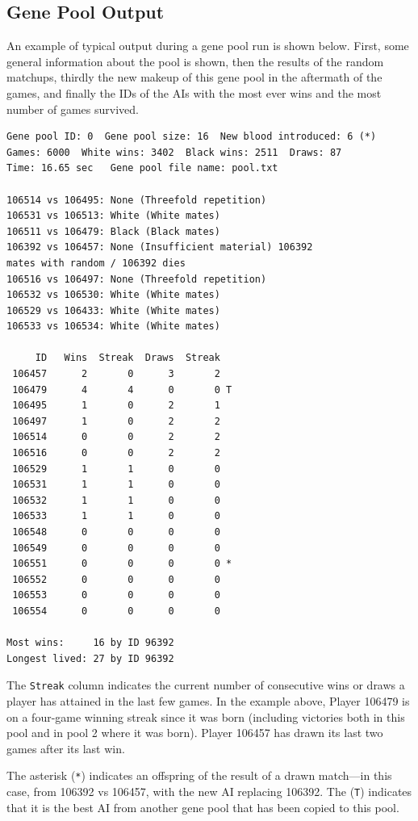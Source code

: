 \documentclass[letterpaper]{article}
\renewcommand{\_}{\allowbreak\textunderscore\allowbreak}
\begin{document}
\subsection{Gene Pool Output}
An example of typical output during a gene pool run is shown below. First, some general information about the pool is shown, then the results of the random matchups, thirdly the new makeup of this gene pool in the aftermath of the games, and finally the IDs of the AIs with the most ever wins and the most number of games survived.
\begin{verbatim}
Gene pool ID: 0  Gene pool size: 16  New blood introduced: 6 (*)
Games: 6000  White wins: 3402  Black wins: 2511  Draws: 87
Time: 16.65 sec   Gene pool file name: pool.txt

106514 vs 106495: None (Threefold repetition)
106531 vs 106513: White (White mates)
106511 vs 106479: Black (Black mates)
106392 vs 106457: None (Insufficient material) 106392
mates with random / 106392 dies
106516 vs 106497: None (Threefold repetition)
106532 vs 106530: White (White mates)
106529 vs 106433: White (White mates)
106533 vs 106534: White (White mates)

     ID   Wins  Streak  Draws  Streak
 106457      2       0      3       2
 106479      4       4      0       0 T
 106495      1       0      2       1
 106497      1       0      2       2
 106514      0       0      2       2
 106516      0       0      2       2
 106529      1       1      0       0
 106531      1       1      0       0
 106532      1       1      0       0
 106533      1       1      0       0
 106548      0       0      0       0
 106549      0       0      0       0
 106551      0       0      0       0 *
 106552      0       0      0       0
 106553      0       0      0       0
 106554      0       0      0       0

Most wins:     16 by ID 96392
Longest lived: 27 by ID 96392

\end{verbatim}
The \verb|Streak| column indicates the current number of consecutive wins or draws a player has attained in the last few games. In the example above, Player 106479 is on a four-game winning streak since it was born (including victories both in this pool and in pool 2 where it was born). Player 106457 has drawn its last two games after its last win.

The asterisk (\verb|*|) indicates an offspring of the result of a drawn match---in this case, from 106392 vs 106457, with the new AI replacing 106392. The (\verb|T|) indicates that it is the best AI from another gene pool that has been copied to this pool.
\end{document}
